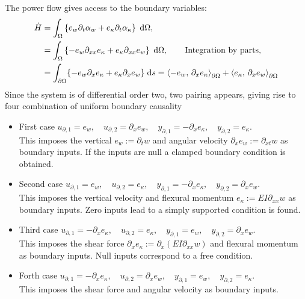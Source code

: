 \documentclass{article}
\newcommand{\inner}[3][]{\ensuremath{\left\langle #2, \, #3 \right\rangle_{#1}}}
\begin{document}
The power flow gives access to the boundary variables:
\begin{equation}
\begin{aligned}
\dot{H} &= \int_{\Omega} \left\{e_w \partial_t \alpha_w + e_\kappa \partial_t \alpha_\kappa \right\}  \d{\Omega}, \\
&= \int_{\Omega} \left\{-e_w \partial_{xx}e_\kappa + e_\kappa \partial_{xx} e_w \right\} \d{\Omega}, \qquad \text{Integration by parts}, \\
&= \int_{\partial\Omega}\{-e_w \partial_{x}e_\kappa + e_\kappa \partial_{x} e_w \} \d{s}= \inner[\partial\Omega]{-e_w}{\partial_{x}e_\kappa} + \inner[\partial\Omega]{e_\kappa}{\partial_{x}e_w}
\end{aligned}
\end{equation}
Since the system is of differential order two, two pairing appears, giving rise to four combination of uniform boundary causality
\begin{itemize}
	\item {First case} ${u}_{\partial, 1} = e_w, \quad {u}_{\partial, 2} = \partial_x e_w, \quad {y}_{\partial, 1} = -\partial_{x}e_\kappa, \quad {y}_{\partial, 2} = e_\kappa$. \\
	This imposes the vertical $e_w:= \partial_t w$ and angular velocity $\partial_x e_w:= \partial_{xt} w$ as boundary inputs. If the inputs are null a clamped boundary condition is obtained.
	\item {Second case} ${u}_{\partial, 1} = e_w, \quad {u}_{\partial, 2} = e_\kappa, \quad {y}_{\partial, 1} = -\partial_{x}e_\kappa, \quad {y}_{\partial, 2} = \partial_x e_w$. \\
	This imposes the vertical velocity and flexural momentum $e_\kappa:= EI \partial_{xx} w$ as boundary inputs.  Zero inputs lead to a simply supported condition is found.
	\item {Third case} ${u}_{\partial, 1} = -\partial_{x}e_\kappa , \quad {u}_{\partial, 2} = e_\kappa, \quad {y}_{\partial, 1} = e_w, \quad {y}_{\partial, 2} = \partial_x e_w$. \\
	This imposes the shear force $\partial_{x}e_\kappa:= \partial_{x}(EI \partial_{xx}w)$ and flexural momentum as boundary inputs. Null inputs correspond to a free condition.
	\item {Forth case} ${u}_{\partial, 1} = -\partial_{x}e_\kappa , \quad {u}_{\partial, 2} = \partial_{x}e_w, \quad {y}_{\partial, 1} = e_w, \quad {y}_{\partial, 2} = e_\kappa$. \\
	This imposes the shear force and angular velocity as boundary inputs.
\end{itemize} 
\end{document}
